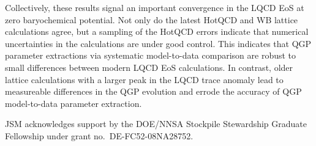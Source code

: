 \documentclass[aps,prc,reprint,amsmath,nofootinbib,superscriptaddress]{revtex4-1}
\begin{document}
Collectively, these results signal an important convergence in the LQCD EoS at zero baryochemical potential. Not only do the latest HotQCD and WB lattice calculations agree, but a sampling of the HotQCD errors indicate that numerical uncertainties in the calculations are under
good control. This indicates that QGP parameter extractions via systematic model-to-data comparison are robust to small differences between modern LQCD EoS calculations. In contrast, older lattice calculations with a larger peak in the LQCD trace anomaly lead to measureable differences in the QGP evolution and errode the accuracy of QGP model-to-data parameter extraction.

\begin{acknowledgments}
 JSM acknowledges support by the DOE/NNSA Stockpile Stewardship Graduate Fellowship under grant no.~DE-FC52-08NA28752.
\end{acknowledgments}


\end{document}
